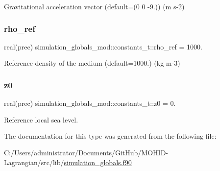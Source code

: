 Gravitational acceleration vector (default=(0 0 -\/9.)) (m s-\/2) 

\mbox{\label{structsimulation__globals__mod_1_1constants__t_a7e4a2bb5206340621bfce6792b527f6d}} 
\subsubsection{\texorpdfstring{rho\+\_\+ref}{rho\_ref}}
{\footnotesize\ttfamily real(prec) simulation\+\_\+globals\+\_\+mod\+::constants\+\_\+t\+::rho\+\_\+ref = 1000.\hspace{0.3cm}{\ttfamily [private]}}



Reference density of the medium (default=1000.) (kg m-\/3) 

\mbox{\label{structsimulation__globals__mod_1_1constants__t_a737e824cf720aea683fe23939d12aa5b}} 
\subsubsection{\texorpdfstring{z0}{z0}}
{\footnotesize\ttfamily real(prec) simulation\+\_\+globals\+\_\+mod\+::constants\+\_\+t\+::z0 = 0.\hspace{0.3cm}{\ttfamily [private]}}



Reference local sea level. 



The documentation for this type was generated from the following file\+:\begin{DoxyCompactItemize}
\item 
C\+:/\+Users/administrator/\+Documents/\+Git\+Hub/\+M\+O\+H\+I\+D-\/\+Lagrangian/src/lib/\hyperlink{simulation__globals_8f90}{simulation\+\_\+globals.\+f90}\end{DoxyCompactItemize}
